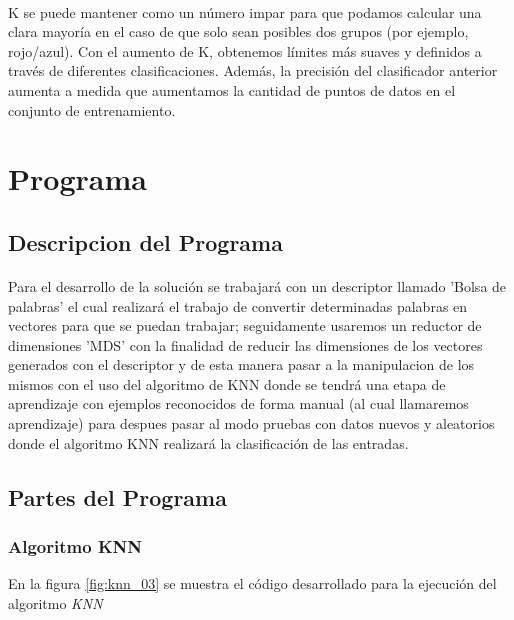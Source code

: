 \documentclass{article}
\begin{document}
\paragraph{}
K se puede mantener como un número impar para que podamos calcular una clara mayoría en el caso de que solo sean posibles dos grupos (por ejemplo, rojo/azul). Con el aumento de K, obtenemos límites más suaves y definidos a través de diferentes clasificaciones. Además, la precisión del clasificador anterior aumenta a medida que aumentamos la cantidad de puntos de datos en el conjunto de entrenamiento.

\clearpage
\section{Programa}

\subsection{Descripcion del Programa}
\paragraph{}
Para el desarrollo de la solución se trabajará con un descriptor llamado 'Bolsa de palabras' el cual realizará el trabajo de convertir determinadas palabras en vectores para que se puedan trabajar; seguidamente usaremos un reductor de dimensiones 'MDS' con la finalidad de reducir las dimensiones de los vectores generados con el descriptor y de esta manera pasar a la manipulacion de los mismos con el uso del algoritmo de KNN donde se tendrá una etapa de aprendizaje con ejemplos reconocidos de forma manual (al cual llamaremos aprendizaje) para despues pasar al modo pruebas con datos nuevos y aleatorios donde el algoritmo KNN realizará la clasificación de las entradas.

\clearpage
\subsection{Partes del Programa}

\subsubsection{Algoritmo KNN}
En la figura \ref{fig:knn_03} se muestra el código desarrollado para la ejecución del algoritmo \textit{KNN}
\end{document}
